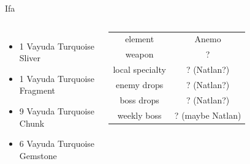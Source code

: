 \documentclass{beamer}
\begin{document}
\begin{frame}{Ifa}
\begin{columns}
        \begin{itemize}
            \item 1 Vayuda Turquoise Sliver
            \item 1 Vayuda Turquoise Fragment
            \item 9 Vayuda Turquoise Chunk
            \item 6 Vayuda Turquoise Gemstone
        \end{itemize}
        \pause 
\begin{tabular}{|c|c|}
    \hline 
element & Anemo \\
weapon & ? \\
local specialty & ? (Natlan?)\\
enemy drops & ? (Natlan?)\\
boss drops & ? (Natlan?)\\
weekly boss & ? (maybe Natlan)\\\hline
\end{tabular}
\pause 


\end{columns}
\end{frame}
\end{document}
